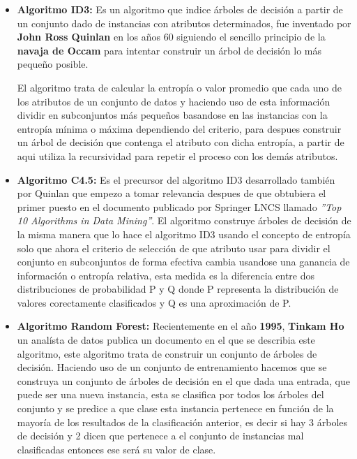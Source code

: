 \documentclass[a4paper, 11pt]{article} %
\begin{document}
\begin{itemize}
\item \textbf{Algoritmo ID3:} Es un algoritmo que indice árboles de decisión a partir de un conjunto dado de instancias con atributos determinados, fue inventado por \textbf{John Ross Quinlan} en los años 60 siguiendo el sencillo principio de la \textbf{navaja de Occam} para intentar construir un árbol de decisión lo más pequeño posible.

El algoritmo trata de calcular la entropía o valor promedio que cada uno de los atributos de un conjunto de datos y haciendo uso de esta información dividir en subconjuntos más pequeños basandose en las instancias con la entropía mínima o máxima dependiendo del criterio, para despues construir un árbol de decisión que contenga el atributo con dicha entropía, a partir de aqui utiliza la recursividad para repetir el proceso con los demás atributos.
\item \textbf{Algoritmo C4.5:} Es el precursor del algoritmo ID3 desarrollado también por Quinlan que empezo a tomar relevancia despues de que obtubiera el primer puesto  en el documento publicado por Springer LNCS llamado \textit{''Top 10 Algorithms in Data Mining''}.
El algoritmo construye árboles de decisión de la misma manera que lo hace el algoritmo ID3 usando el concepto de entropía solo que ahora el criterio de selección de que atributo usar para dividir el conjunto en subconjuntos de forma efectiva cambia usandose una ganancia de información o entropía relativa, esta medida es la diferencia entre dos distribuciones de probabilidad P y Q donde P representa la distribución de valores corectamente clasificados y Q  es una aproximación de P.
\item \textbf{Algoritmo Random Forest:} Recientemente en el año \textbf{1995}, \textbf{Tinkam Ho} un analísta de datos publica un documento en el que se describia este algoritmo, este algoritmo trata de construir un conjunto de árboles de decisión. Haciendo uso de un conjunto de entrenamiento hacemos que se construya un conjunto de árboles de decisión en el que dada una entrada, que puede ser una nueva instancia, esta se clasifica por todos los árboles del conjunto y se predice a que clase esta instancia pertenece en función de la mayoría de los resultados de la clasificación anterior, es decir si hay 3 árboles de decisión y 2 dicen que pertenece a el conjunto de instancias mal clasificadas entonces ese será su valor de clase.
\end{itemize}
\end{document}
